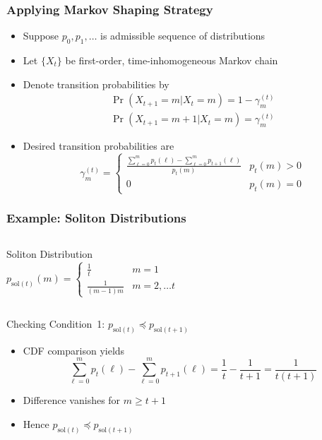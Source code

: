 \documentclass[10pt]{beamer}
\begin{document}
\begin{frame}
\frametitle{Applying Markov Shaping Strategy}
\begin{center}

\end{center}
\begin{itemize}
\item Suppose $p_0, p_1, \ldots$ is admissible sequence of distributions
\item Let $\{ X_t \}$ be first-order, time-inhomogeneous Markov chain
\item Denote transition probabilities by
\begin{gather*}
\Pr (X_{t+1} = m | X_t = m) = 1 - \gamma^{(t)}_m \\
\Pr (X_{t+1} = m+1 | X_t = m) = \gamma^{(t)}_m
\end{gather*}
\item Desired transition probabilities are
\begin{equation*}
\gamma^{(t)}_m = \begin{cases}
\frac{ \sum_{\ell=0}^m p_t(\ell)
- \sum_{\ell=0}^m p_{t+1}(\ell) }{p_t(m)}
& p_t(m) > 0 \\ 0 & p_t(m) = 0
\end{cases}
\end{equation*}
\end{itemize}
\end{frame}


\begin{frame}
\frametitle{Example: Soliton Distributions}
\begin{columns}
  Soliton Distribution
  \begin{equation*}
  p_{\mathrm{sol}(t)}(m)
  = \begin{cases}
  \frac{1}{t} & m = 1 \\
  \frac{1}{(m-1)m} & m = 2, \ldots t
  \end{cases}
  \end{equation*}
  \begin{center}
  \scalebox{0.9}{}
  \end{center}
\end{columns}
\begin{block}{Checking Condition~1: $p_{\mathrm{sol}(t)} \preceq p_{\mathrm{sol}(t+1)}$}
\begin{itemize}
\item CDF comparison yields
\begin{equation*}
\sum_{\ell=0}^m p_t(\ell) - \sum_{\ell=0}^m p_{t+1}(\ell)
= \frac{1}{t} - \frac{1}{t+1}
= \frac{1}{t(t+1)}
\end{equation*}
\item Difference vanishes for $m \geq t+1$
\item Hence $p_{\mathrm{sol}(t)} \preceq p_{\mathrm{sol}(t+1)}$
\end{itemize}
\end{block}
\end{frame}
\end{document}
